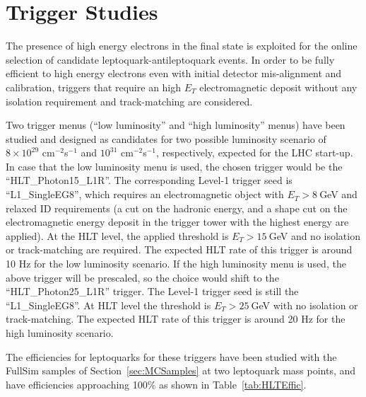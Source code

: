 %
\section{Trigger Studies} \label{sec:trig}

The presence of high energy electrons in the final state is exploited for the online selection 
of candidate leptoquark-antileptoquark events.
In order to be fully efficient to high energy electrons even with initial detector mis-alignment 
and calibration, triggers that require an high $E_T$ electromagnetic deposit without any isolation 
requirement and track-matching are considered.

Two trigger menus  (``low luminosity'' and ``high luminosity'' menus) 
have been studied and designed as candidates for 
two possible luminosity scenario of $8\times10^{29}$ cm$^{-2}$s$^{-1}$ and $10^{31}$ cm$^{-2}$s$^{-1}$,
respectively, expected for the LHC start-up.
In case that the low luminosity menu is used, the chosen trigger 
would be the ``HLT\_Photon15\_L1R''.
The corresponding Level-1 trigger seed is ``L1\_SingleEG8'', 
which requires an electromagnetic object with $E_T>8~$GeV and relaxed ID requirements
(a cut on the hadronic energy, and a
shape cut on the electromagnetic energy deposit in
the trigger tower with the highest energy are applied). 
At the HLT level, the applied threshold is $E_T>15~$GeV and no isolation 
or track-matching are required. 
The expected HLT rate of this trigger is around 10 Hz for the low luminosity scenario.
If the high luminosity menu is used, the above trigger will be prescaled, 
so the choice would shift to the ``HLT\_Photon25\_L1R'' trigger. 
The Level-1 trigger seed is still the ``L1\_SingleEG8''. At HLT level the 
threshold is $E_T>25~$GeV with no isolation or track-matching. 
The expected HLT rate of this trigger is around 20 Hz for the high luminosity scenario.

The efficiencies for leptoquarks for these triggers have been studied with the FullSim 
samples of Section~\ref{sec:MCSamples} at two leptoquark mass points, and have efficiencies approaching
100\% as shown in Table~\ref{tab:HLTEffic}.


